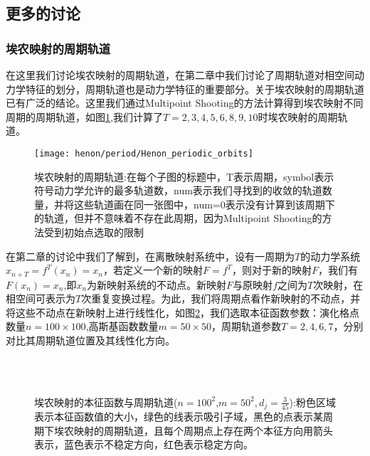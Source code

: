 \subsection{更多的讨论}
\subsubsection{埃农映射的周期轨道}
在这里我们讨论埃农映射的周期轨道，在第二章中我们讨论了周期轨道对相空间动力学特征的划分，周期轨道也是动力学特征的重要部分。关于埃农映射的周期轨道已有广泛的结论\cite{biham1989characterization}。这里我们通过Multipoint Shooting的方法\cite{yang2009locating}计算得到埃农映射不同周期的周期轨道，如图\ref{fig:Henon_periodic_orbits},我们计算了$T=2,3,4,5,6,8,9,10$时埃农映射的周期轨道。
\begin{figure}
	\centering
	\texttt{[image: henon/period/Henon\_periodic\_orbits]}
    \caption[埃农映射的周期轨道]{埃农映射的周期轨道:在每个子图的标题中，T表示周期，symbol表示符号动力学允许的最多轨道数，num表示我们寻找到的收敛的轨道数量，并将这些轨道画在同一张图中，num=0表示没有计算到该周期下的轨道，但并不意味着不存在此周期，因为Multipoint Shooting的方法受到初始点选取的限制}\label{fig:Henon_periodic_orbits}
\end{figure}
在第二章的讨论中我们了解到，在离散映射系统中，设有一周期为$T$的动力学系统$x_{n+T}=f^T(x_n)=x_n$，若定义一个新的映射$F=f^T$，则对于新的映射$F$，我们有$F(x_n)=x_n$,即$x_n$为新映射系统的不动点。新映射$F$与原映射$f$之间为$T$次映射，在相空间可表示为$T$次重复变换过程。为此，我们将周期点看作新映射的不动点，并将这些不动点在新映射上进行线性化，如图\ref{fig:Henon_eigen_Gauss_period_n100m50T7}，我们选取本征函数参数：演化格点数量$n=100\times 100$,高斯基函数数量$m=50\times 50$，周期轨道参数$T=2,4,6,7$，分别对比其周期轨道位置及其线性化方向。
\begin{figure}
    \centering
    \\
    \\
    \caption[埃农映射的本征函数与周期轨道]{埃农映射的本征函数与周期轨道($n=100^2$,$m=50^2,d_j=\frac{3}{45}$):粉色区域表示本征函数值的大小，绿色的线表示吸引子域，黑色的点表示某周期下埃农映射的周期轨道，且每个周期点上存在两个本征方向用箭头表示，蓝色表示不稳定方向，红色表示稳定方向。}\label{fig:Henon_eigen_Gauss_period_n100m50T7}
\end{figure}
